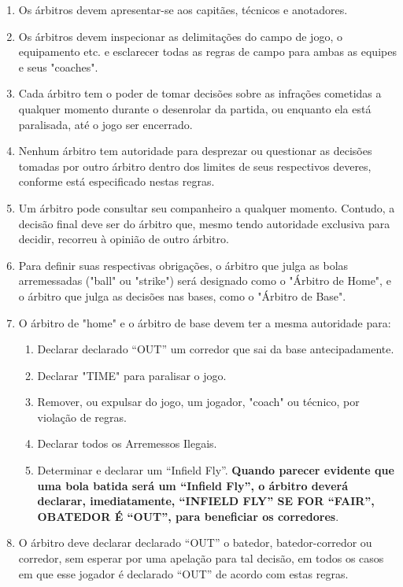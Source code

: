 \begin{multicols}{2}
\begin{enumerate}[label=\alph*)]
		\item  Os árbitros devem apresentar-se aos capitães, técnicos e anotadores. 
		
		\item  Os árbitros devem inspecionar as delimitações do campo de jogo, o equipamento etc. e esclarecer todas as regras de campo para ambas as equipes e seus "coaches". 
		
		\item  Cada árbitro tem o poder de tomar decisões sobre as infrações cometidas a qualquer momento durante o desenrolar da partida, ou enquanto ela está paralisada, até o jogo ser encerrado.
		\item Nenhum árbitro tem autoridade para desprezar ou questionar as decisões tomadas por outro árbitro dentro dos limites de seus respectivos deveres, conforme está especificado nestas regras. 
		
		\item  Um árbitro pode consultar seu companheiro a qualquer momento. Contudo, a decisão final deve ser do árbitro que, mesmo tendo autoridade exclusiva para decidir, recorreu à opinião de outro árbitro. 
		
		\item  Para definir suas respectivas obrigações, o árbitro que julga as bolas arremessadas ("ball" ou "strike") será designado como o "Árbitro de Home", e o árbitro que julga as decisões nas bases, como o "Árbitro de Base". 
		
		\item  O árbitro de "home" e o árbitro de base devem ter a mesma autoridade para: 
		\begin{enumerate}[label= \arabic*)]
			\item Declarar declarado “OUT” um corredor que sai da base antecipadamente. 
			\item Declarar "TIME" para paralisar o jogo. 
			\item Remover, ou expulsar do jogo, um jogador, "coach" ou técnico, por violação de regras. 
			\item Declarar todos os Arremessos Ilegais. 
			\item Determinar e declarar um “Infield Fly”. \textbf{Quando parecer evidente que uma bola batida será um “Infield Fly”, o árbitro deverá declarar, imediatamente, “INFIELD FLY” SE FOR “FAIR”, OBATEDOR É “OUT”, para beneficiar os corredores}.
		\end{enumerate}
		\item  O árbitro deve declarar declarado “OUT” o batedor, batedor-corredor ou corredor, sem esperar por uma apelação para tal decisão, em todos os casos em que esse jogador é declarado “OUT” de acordo com estas regras. 
		

\end{enumerate}
\end{multicols}
